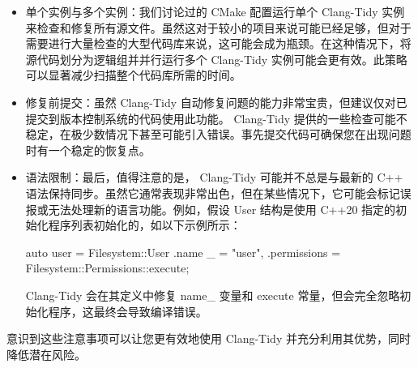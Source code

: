 \begin{itemize}
\item
单个实例与多个实例：我们讨论过的 CMake 配置运行单个 Clang-Tidy 实例来检查和修复所有源文件。虽然这对于较小的项目来说可能已经足够，但对于需要进行大量检查的大型代码库来说，这可能会成为瓶颈。在这种情况下，将源代码划分为逻辑组并并行运行多个 Clang-Tidy 实例可能会更有效。此策略可以显著减少扫描整个代码库所需的时间。

\item
修复前提交：虽然 Clang-Tidy 自动修复问题的能力非常宝贵，但建议仅对已提交到版本控制系统的代码使用此功能。 Clang-Tidy 提供的一些检查可能不稳定，在极少数情况下甚至可能引入错误。事先提交代码可确保您在出现问题时有一个稳定的恢复点。

\item
语法限制：最后，值得注意的是， Clang-Tidy 可能并不总是与最新的 C++ 语法保持同步。虽然它通常表现非常出色，但在某些情况下，它可能会标记误报或无法处理新的语言功能。例如，假设 User 结构是使用 C++20 指定的初始化程序列表初始化的，如以下示例所示：

\begin{cpp}
auto user = Filesystem::User{
    .name _ = "user", .permissions =
Filesystem::Permissions::execute};
\end{cpp}

Clang-Tidy 会在其定义中修复 name\_ 变量和 execute 常量，但会完全忽略初始化程序，这最终会导致编译错误。
\end{itemize}

意识到这些注意事项可以让您更有效地使用 Clang-Tidy 并充分利用其优势，同时降低潜在风险。
